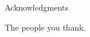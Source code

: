 \baselineskip=25pt
\begin{center}
{Acknowledgments}
\end{center}

\vskip 0.5in 
The people you thank. 



